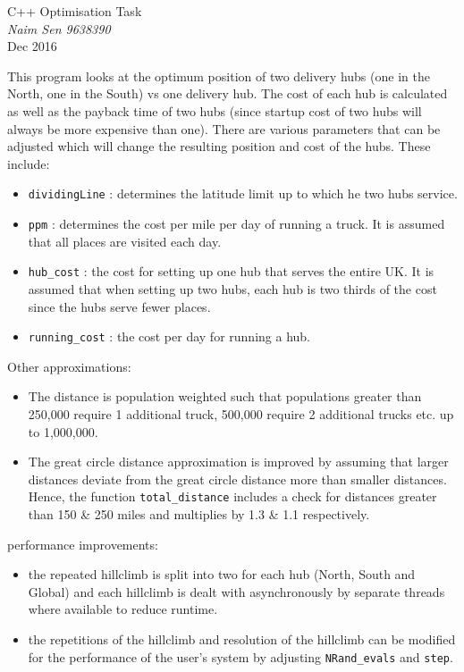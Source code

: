 \documentclass[12pt]{article}
\begin{document}
	\begin{center}
		{\Huge C++ Optimisation Task}
		\\[0.5cm]
		{\Large \textit{Naim Sen 9638390} \\[0.3cm] Dec 2016 \\[0.5cm]}
	\end{center}
This program looks at the optimum position of two delivery hubs (one in the North, one in the South) vs one delivery hub. The cost of each hub is calculated as well as the payback time of two hubs (since startup cost of two hubs will always be more expensive than one). There are various parameters that can be adjusted which will change the resulting position and cost of the hubs. These include:
\begin{itemize}
	\item \texttt{dividingLine} : determines the latitude limit up to which he two hubs service.
	\item \texttt{ppm} : determines the cost per mile per day of running a truck. It is assumed that all places are visited each day.
	\item \texttt{hub_cost} : the cost for setting up one hub that serves the entire UK. It is assumed that when setting up two hubs, each hub is two thirds of the cost since the hubs serve fewer places.
	\item \texttt{running_cost} : the cost per day for running a hub. 
\end{itemize}

Other approximations:
\begin{itemize}
	\item The distance is population weighted such that populations greater than 250,000 require 1 additional truck, 500,000 require 2 additional trucks etc. up to 1,000,000.
	 \item The great circle distance approximation is improved by assuming that larger distances deviate from the great circle distance more than smaller distances. Hence, the function \texttt{total_distance} includes a check for distances greater than 150 \& 250 miles and multiplies by 1.3 \& 1.1 respectively.
\end{itemize}
performance improvements:
\begin{itemize}
	\item the repeated hillclimb is split into two for each hub (North, South and Global) and each hillclimb is dealt with asynchronously by separate threads where available to reduce runtime. 
	\item the repetitions of the hillclimb and resolution of the hillclimb can be modified for the performance of the user's system by adjusting \texttt{NRand_evals} and \texttt{step}. 
\end{itemize}
\end{document}
